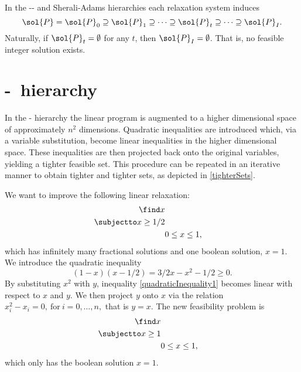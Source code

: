 \documentclass[a4paper,twoside,justified]{tufte-handout}
\begin{document}
In the \Lovasz-\Schrijver- and Sherali-Adams hierarchies each relaxation system induces
\begin{equation}
\label{tighterSets}
\sol{P}=\sol{P}_{0} \supseteq \sol{P}_{1} \supseteq \cdots
  \supseteq \sol{P}_{t} \supseteq \cdots\supseteq \sol{P}_{I}.
\end{equation}
Naturally, if $\sol{P}_{t}=\emptyset$ for any $t$, then $\sol{P}_{I}=\emptyset$. That is, no feasible integer solution exists.

\section{\Lovasz-\Schrijver\ hierarchy}
In the \Lovasz-\Schrijver\cite{lovasz1991cones} hierarchy the linear program is augmented to a higher dimensional space of approximately $n^2$ dimensions. Quadratic inequalities are introduced which, via a variable substitution, become linear inequalities in the higher dimensional space. These inequalities are then projected back onto the original variables, yielding a tighter feasible set. This procedure can be repeated in an iterative manner to obtain tighter and tighter sets, as depicted in \eqref{tighterSets}.

\begin{example}
We want to improve the following linear relaxation:
\begin{alignat}{2}
\label{example1}
  \find x\notag \\
  \subjectto x \geq 1/2 \\
  & 0\leq x\leq 1,\notag
\end{alignat}
which has infinitely many fractional solutions and one boolean solution, $x=1$. We introduce the quadratic inequality 
\begin{equation}
\label{quadraticInequality1}
(1-x)(x-1/2)=3/2x-x^2-1/2\geq 0. 
\end{equation}
By substituting $x^2$ with $y$, inequality \eqref{quadraticInequality1} becomes linear with respect to $x$ and $y$. We then project $y$ onto $x$ via the relation $x_i^2-x_i=0,\ \text{for}\ i=0,\ldots,n,$ that is $y=x$. The new feasibility problem is
\begin{alignat}{2}
\label{example2}
  \find x\notag \\
  \subjectto x \geq 1 \\
  & 0\leq x\leq 1,\notag
\end{alignat}
which only has the boolean solution $x=1$.
\end{example}
\end{document}
